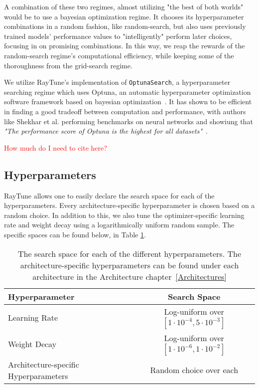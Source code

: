 A combination of these two regimes, almost utilizing "the best of both worlds" would be to use a bayesian optimization regime. It chooses its hyperparameter combinations in a random fashion, like random-search, but also uses previously trained models' performance values to "intelligently" perform later choices, focusing in on promising combinations. In this way, we reap the rewards of the random-search regime's computational efficiency, while keeping some of the thoroughness from the grid-search regime.

We utilize RayTune's implementation of \texttt{OptunaSearch}, a hyperparameter searching regime which uses Optuna, an automatic hyperparameter optimization software framework based on bayesian optimization~\cite{akiba2019optuna}. It has shown to be efficient in finding a good tradeoff between computation and performance, with authors like Shekhar et al. performing benchmarks on neural networks and showiung that \textit{"The performance score of Optuna is the highest for all datasets"}~\cite{shekhar2021comparative}.

\textcolor{red}{How much do I need to cite here?}

\subsection{Hyperparameters}

RayTune allows one to easily declare the search space for each of the hyperparameters. Every architecture-specific hyperparameter is chosen based on a random choice. In addition to this, we also tune the optimizer-specific learning rate and weight decay using a logarithmically uniform random sample. The specific spaces can be found below, in Table \ref{MethodHyperparams}.

\begin{table}[H]
    \centering
    \begin{tabular}{l|c}
        Hyperparameter & Search Space       \\
        \hline
        Learning Rate      & Log-uniform over $[1\cdot{10}^{-4}, 5\cdot{10}^{-3}]$ \\
        Weight Decay     & Log-uniform over $[1\cdot{10}^{-6}, 1\cdot{10}^{-2}]$ \\
        Architecture-specific Hyperparameters      & Random choice over each \\
    \end{tabular}
    \caption{The search space for each of the different hyperparameters. The architecture-specific hyperparameters can be found under each architecture in the Architecture chapter~\ref{Architectures}}
    \label{MethodHyperparams}
\end{table}